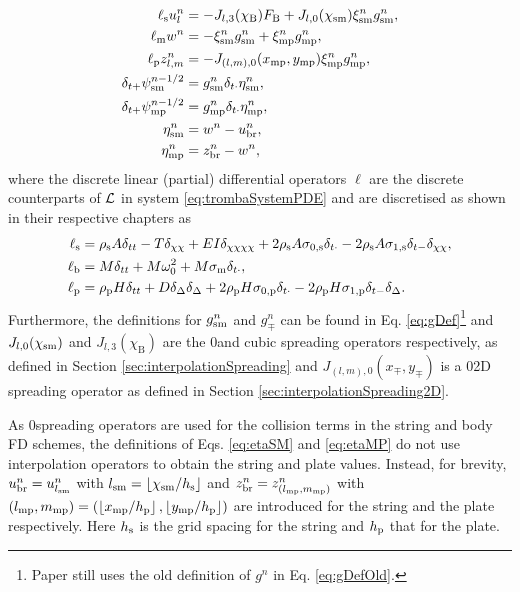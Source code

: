 \begin{subequations}\label{eq:trombaSystemFDS}
    \begin{align}
        \ell_\text{s}u_l^n &= -J_{l,3}(\chi_\text{B})F_{\text{B}} + J_{l,0}(\chi_{\text{sm}})\xi_{\text{sm}}^n g^n_{\text{sm}},\label{eq:trombaSystemFDSString}\\
        \ell_\text{m}w^n &= - \xi_{\text{sm}}^n g^n_{\text{sm}} + \xi_{\text{mp}}^n g^n_{\text{mp}},\label{eq:trombaSystemFDSMass}\\
        \ell_\text{p}z_{l,m}^n &= -J_{(l,m),0}(x_{\text{mp}}, y_{\text{mp}})\xi_{\text{mp}}^n g^n_{\text{mp}},\label{eq:trombaSystemFDSPlate}\\
        \delta_{t+}\psi^{n-1/2}_{\text{sm}} &= g^n_{\text{sm}} \delta_{t\cdot} \eta^n_{\text{sm}},\label{eq:psiSM}\\
        \delta_{t+}\psi^{n-1/2}_{\text{mp}} &= g^n_{\text{mp}} \delta_{t\cdot} \eta^n_{\text{mp}},\label{eq:psiMP}\\
        \eta^n_{\text{sm}} &= w^n - u_\text{br}^n,\label{eq:etaSM}\\
        \eta^n_{\text{mp}} &= z_\text{br}^n - w^n,\label{eq:etaMP}
    \end{align}
\end{subequations}
where the discrete linear (partial) differential operators $\ell$ are the discrete counterparts of $\mathcal{L}$ in system \eqref{eq:trombaSystemPDE} and are discretised as shown in their respective chapters as
\begin{subequations}\label{eq:fdsOperators}
\begin{align}
    \ell_\text{s} &=\rho_\text{s}A\delta_{tt}- T\delta_{\chi\chi} + EI\delta_{\chi\chi\chi\chi}+ 2\rho_\text{s}A\sigma_{0,\text{s}}\delta_{t\cdot}-2\rho_\text{s}A\sigma_{1,\text{s}}\delta_{t-}\delta_{\chi\chi},\\
    \ell_\text{b} &= M\delta_{tt} + M\omega_0^2 + M\sigma_\text{m} \delta_{t\cdot},\\
    \ell_\text{p} &= \rho_\text{p} H \delta_{tt} + D\delta_{\Delta}\delta_{\Delta} + 2\rho_\text{p}H\sigma_{0, \text{p}}\delta_{t\cdot} - 2\rho_\text{p}H\sigma_{1, \text{p}}\delta_{t-}\delta_{\Delta}.
    \end{align}
\end{subequations}
Furthermore, the definitions for $g_{\text{sm}}^n$ and $g_\mp^n$ can be found in Eq. \eqref{eq:gDef}\footnote{Paper \citeP[D] still uses the old definition of $g^n$ in Eq. \eqref{eq:gDefOld}.} and $J_{l,0}(\chi_{\text{sm}})$ and $J_{l,3}(\chi_\text{B})$ are the $0$\thOrder and cubic spreading operators respectively, as defined in Section \ref{sec:interpolationSpreading} and $J_{(l,m),0}(x_\mp, y_\mp)$ is a $0$\thOrder 2D spreading operator as defined in Section \ref{sec:interpolationSpreading2D}.

As $0$\thOrder spreading operators are used for the collision terms in the string and body FD schemes, the definitions of Eqs. \eqref{eq:etaSM} and \eqref{eq:etaMP} do not use interpolation operators to obtain the string and plate values. Instead, for brevity, $u_\text{br}^n = u_{l_{\text{sm}}}^n$ with $l_\sm = \floor[\chi_\sm / h_\stxt]$ and $z_\text{br}^n = z_{(l_{\text{mp}}, m_{\text{mp}})}^n$ with $(l_\mp, m_\mp) = (\floor[x_\mp / h_\ptxt], \floor[y_\mp / h_\ptxt])$ are introduced for the string and the plate respectively. Here $h_{\text{s}}$ is the grid spacing for the string and $h_{\text{p}}$ that for the plate. 

